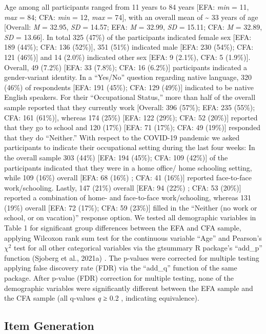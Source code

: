 \documentclass[
  english,
  man]{apa6}
\begin{document}
Age among all participants ranged from 11 years to 84 years {[}EFA: \emph{min} = 11, \emph{max} = 84; CFA: \emph{min} = 12, \emph{max} = 74{]}, with an overall mean of \textasciitilde{} 33 years of age {[}Overall: \emph{M} = 32.95, \emph{SD} = 14.57; EFA: \emph{M} = 32.99, \emph{SD} = 15.11; CFA: \emph{M} = 32.89, \emph{SD} = 13.66{]}. In total 325 (47\%) of the participants indicated female sex {[}EFA: 189 (44\%); CFA: 136 (52\%){]}, 351 (51\%) indicated male {[}EFA: 230 (54\%); CFA: 121 (46\%){]} and 14 (2.0\%) indicated other sex {[}EFA: 9 (2.1\%), CFA: 5 (1.9\%){]}. Overall, 49 (7.2\%) {[}EFA: 33 (7.8\%); CFA: 16 (6.2\%){]} participants indicated a gender-variant identity. In a ``Yes/No'' question regarding native language, 320 (46\%) of respondents {[}EFA: 191 (45\%); CFA: 129 (49\%){]} indicated to be native English speakers. For their ``Occupational Status,'' more than half of the overall sample reported that they currently work {[}Overall: 396 (57\%); EFA: 235 (55\%); CFA: 161 (61\%){]}, whereas 174 (25\%) {[}EFA: 122 (29\%); CFA: 52 (20\%){]} reported that they go to school and 120 (17\%) {[}EFA: 71 (17\%); CFA: 49 (19\%){]} responded that they do ``Neither.'' With respect to the COVID-19 pandemic we asked participants to indicate their occupational setting during the last four weeks: In the overall sample 303 (44\%) {[}EFA: 194 (45\%); CFA: 109 (42\%){]} of the participants indicated that they were in a home office/ home schooling setting, while 109 (16\%) overall {[}EFA: 68 (16\%) ; CFA: 41 (16\%){]} reported face-to-face work/schooling. Lastly, 147 (21\%) overall {[}EFA: 94 (22\%) ; CFA: 53 (20\%){]} reported a combination of home- and face-to-face work/schooling, whereas 131 (19\%) overall {[}EFA: 72 (17\%); CFA: 59 (23\%){]} filled in the ``Neither (no work or school, or on vacation)'' response option. We tested all demographic variables in Table 1 for significant group differences between the EFA and CFA sample, applying Wilcoxon rank sum test for the continuous variable ``Age'' and Pearson's \(\chi^2\) test for all other categorical variables via the gtsummary R package's ``add\_p'' function (Sjoberg et al., 2021a) . The p-values were corrected for multiple testing applying false discovery rate (FDR) via the ``add\_q'' function of the same package. After p-value (FDR) correction for multiple testing, none of the demographic variables were significantly different between the EFA sample and the CFA sample (all q-values \emph{q} ≥ 0.2 , indicating equivalence).

\hypertarget{item-generation}{%
\subsection{Item Generation}\label{item-generation}}
\end{document}
